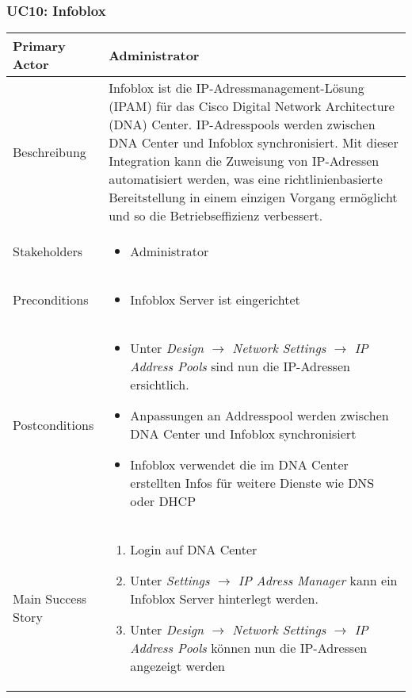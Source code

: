 \subsubsection{UC10: Infoblox}
\begin{table}[H]
	\centering
	\begin{tabularx}{\textwidth}{l | X}
		Primary Actor   & Administrator       \\
		\hline
		Beschreibung   & Infoblox ist die IP-Adressmanagement-Lösung (IPAM) für das Cisco Digital Network Architecture (DNA) Center. IP-Adresspools werden zwischen DNA Center und Infoblox synchronisiert. Mit dieser Integration kann die Zuweisung von IP-Adressen automatisiert werden, was eine richtlinienbasierte Bereitstellung in einem einzigen Vorgang ermöglicht und so die Betriebseffizienz verbessert.  \\ 
		\hline
		Stakeholders       & 
		\begin{itemize}
			\item Administrator
		\end{itemize} \\ 
		Preconditions      &
		\begin{itemize}	
			\item Infoblox Server ist eingerichtet
		\end{itemize}  \\
		\hline
		Postconditions     & 
		\begin{itemize}	
			\item Unter \textit{Design $\rightarrow$ Network Settings $\rightarrow$ IP Address Pools} sind nun die IP-Adressen ersichtlich.
			\item Anpassungen an Addresspool werden zwischen DNA Center und Infoblox synchronisiert
			\item Infoblox verwendet die im DNA Center erstellten Infos für weitere Dienste wie DNS oder DHCP
		\end{itemize}  \\
		\hline
		Main Success Story & 
		\begin{enumerate}
			\item Login auf DNA Center
			\item Unter \textit{Settings $\rightarrow$ IP Adress Manager} kann ein Infoblox Server hinterlegt werden.
			\item Unter \textit{Design $\rightarrow$ Network Settings $\rightarrow$ IP Address Pools} können nun die IP-Adressen angezeigt werden
		\end{enumerate}

\end{tabularx}
\end{table}
